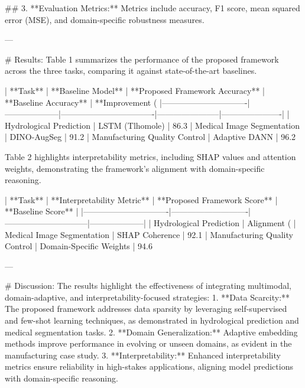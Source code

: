 ## 3. **Evaluation Metrics:**
Metrics include accuracy, F1 score, mean squared error (MSE), and domain-specific robustness measures.

---

# Results:
Table 1 summarizes the performance of the proposed framework across the three tasks, comparing it against state-of-the-art baselines.

| **Task**                      | **Baseline Model** | **Proposed Framework Accuracy** | **Baseline Accuracy** | **Improvement (%
|-------------------------------|--------------------|----------------------------------|-----------------------|----------------------|
| Hydrological Prediction       | LSTM (Tlhomole)   | 86.3%
| Medical Image Segmentation    | DINO-AugSeg       | 91.2%
| Manufacturing Quality Control | Adaptive DANN     | 96.2%

Table 2 highlights interpretability metrics, including SHAP values and attention weights, demonstrating the framework's alignment with domain-specific reasoning.

| **Task**                      | **Interpretability Metric** | **Proposed Framework Score** | **Baseline Score** |
|-------------------------------|----------------------------|------------------------------|--------------------|
| Hydrological Prediction       | Alignment (%
| Medical Image Segmentation    | SHAP Coherence            | 92.1%
| Manufacturing Quality Control | Domain-Specific Weights    | 94.6%

---

# Discussion:
The results highlight the effectiveness of integrating multimodal, domain-adaptive, and interpretability-focused strategies:
1. **Data Scarcity:** The proposed framework addresses data sparsity by leveraging self-supervised and few-shot learning techniques, as demonstrated in hydrological prediction and medical segmentation tasks.
2. **Domain Generalization:** Adaptive embedding methods improve performance in evolving or unseen domains, as evident in the manufacturing case study.
3. **Interpretability:** Enhanced interpretability metrics ensure reliability in high-stakes applications, aligning model predictions with domain-specific reasoning.

